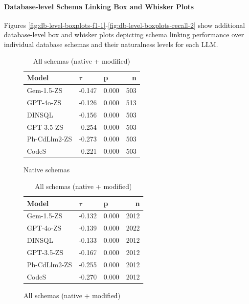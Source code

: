 \paragraph{Database-level Schema Linking Box and Whisker Plots}

Figures \ref{fig:db-level-boxplots-f1-1}-\ref{fig:db-level-boxplots-recall-2} show additional database-level box and whisker plots depicting schema linking performance over individual database schemas and their naturalness levels for each LLM.




\begin{table}
  \centering
  \caption{Kendall-Tau ($\tau$) Correlations between the \emph{Mean Token-to-Character Ratio} and \emph{Query Recall}.}
  \begin{subfigure}{.5\linewidth}
      \centering
      \caption{Native schemas}
      \begin{tabular}{lllr}
\toprule
Model & $\tau$ & p & n \\
\midrule
Gem-1.5-ZS & -0.147 & 0.000 & 503 \\
GPT-4o-ZS & -0.126 & 0.000 & 513 \\
DINSQL & -0.156 & 0.000 & 503 \\
GPT-3.5-ZS & -0.254 & 0.000 & 503 \\
Ph-CdLlm2-ZS & -0.273 & 0.000 & 503 \\
CodeS & -0.221 & 0.000 & 503 \\
\bottomrule
\end{tabular}

      \label{table:tokenratio-recall-ktau-native}
  \end{subfigure}%
  \begin{subfigure}{.5\linewidth}
      \centering
      \caption{All schemas (native + modified)}
      \begin{tabular}{lllr}
\toprule
Model & $\tau$ & p & n \\
\midrule
Gem-1.5-ZS & -0.132 & 0.000 & 2012 \\
GPT-4o-ZS & -0.139 & 0.000 & 2022 \\
DINSQL & -0.133 & 0.000 & 2012 \\
GPT-3.5-ZS & -0.167 & 0.000 & 2012 \\
Ph-CdLlm2-ZS & -0.255 & 0.000 & 2012 \\
CodeS & -0.270 & 0.000 & 2012 \\
\bottomrule
\end{tabular}

      \label{table:tokenratio-recall-ktau-all}
  \end{subfigure}
\end{table}


